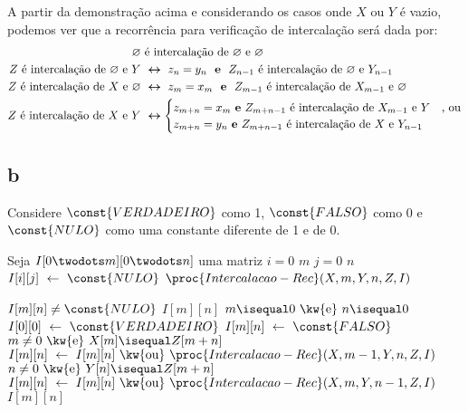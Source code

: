A partir da demonstração acima e considerando os casos onde $X$ ou $Y$ é vazio, podemos ver que a recorrência para verificação de intercalação será dada por:
\begin{align*}
    \varnothing &\text{ é intercalação de } \varnothing \text{ e } \varnothing \\
    Z \text{ é intercalação de } \varnothing \text{ e } Y &~\bm{\leftrightarrow}~ z_n = y_n ~\text{ \textbf{e} }~ Z_{n - 1} \text{ é intercalação de } \varnothing \text{ e } Y_{n - 1} \\
    Z \text{ é intercalação de } X \text{ e } \varnothing &~\bm{\leftrightarrow}~ z_m = x_m ~\text{ \textbf{e} }~ Z_{m - 1} \text{ é intercalação de } X_{m - 1} \text{ e } \varnothing \\
    Z \text{ é intercalação de } X \text{ e } Y &~\bm{\leftrightarrow} \begin{cases}
        z_{m + n} = x_m \text{ \textbf{e} } Z_{m + n - 1} \text{ é intercalação de } X_{m - 1} \text{ e } Y &\text{, ou} \\
        z_{m + n} = y_n \text{ \textbf{e} } Z_{m + n - 1} \text{ é intercalação de } X \text{ e } Y_{n - 1}
    \end{cases}
\end{align*}

\itemdsep

\subsection{b} Considere $\const{VERDADEIRO}$ como 1, $\const{FALSO}$ como 0 e $\const{NULO}$ como uma constante diferente de 1 e de 0.

\def\And{\mbox{ \kw{e} }}
\def\Or{\mbox{ \kw{ou} }}

\begin{codebox}
    \li Seja $I[0 \twodots m][0 \twodots n]$ uma matriz
    \li
    \li {} $i = 0$  $m$
        \Do
    \li     {} $j = 0$  $n$
            \Do
    \li         $I[i][j] \gets \const{NULO}$
            \End
        \End
    \li
    \li {} $\proc{Intercalacao-Rec}(X, m, Y, n, Z, I)$
\end{codebox}

\begin{codebox}
    \li {} $I[m][n] \ne \const{NULO}$
        \Then
    \li     {} $I[m][n]$
        \End
    \li
    \li {} $m \isequal 0 \And n \isequal 0$
        \Then
    \li     $I[0][0] \gets \const{VERDADEIRO}$
        \End
    \li {}
        \Then
    \li     $I[m][n] \gets \const{FALSO}$
    \li     {} $m \ne 0 \And X[m] \isequal Z[m + n]$
            \Then
    \li         $I[m][n] \gets I[m][n] \Or \proc{Intercalacao-Rec}(X, m - 1, Y, n, Z, I)$
            \End
    \li     {} $n \ne 0 \And Y[n] \isequal Z[m + n]$
            \Then
    \li         $I[m][n] \gets I[m][n] \Or \proc{Intercalacao-Rec}(X, m, Y, n-1, Z, I)$
            \End
        \End
    \li
    \li {} $I[m][n]$
\end{codebox}

